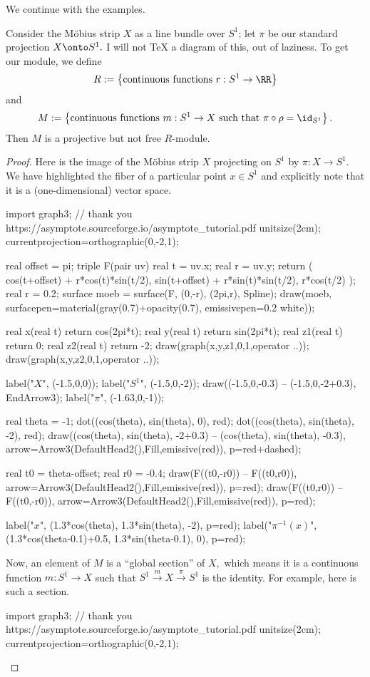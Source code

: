 We continue with the examples.
\begin{exercise}
	Consider the M\"obius strip $X$ as a line bundle over $S^1$; let $\pi$ be our standard projection $X\onto S^1.$ I will not TeX a diagram of this, out of laziness. To get our module, we define
	\[R:=\left\{\text{continuous functions }r:S^1\to\RR\right\}\]
	and
	\[M:=\left\{\text{continuous functions }m:S^1\to X\text{ such that }\pi\circ\rho=\id_{S^1}\right\}.\]
	Then $M$ is a projective but not free $R$-module.
\end{exercise}
\begin{proof}
	Here is the image of the M\"obius strip $X$ projecting on $S^1$ by $\pi:X\to S^1.$ We have highlighted the fiber of a particular point $x\in S^1$ and explicitly note that it is a (one-dimensional) vector space.
	\begin{center}
		\begin{asy}
			import graph3;
			// thank you https://asymptote.sourceforge.io/asymptote_tutorial.pdf
			unitsize(2cm);
			currentprojection=orthographic(0,-2,1);
			
			real offset = pi;
			triple F(pair uv) {
				real t = uv.x;
				real r = uv.y;
				return (
					cos(t+offset) + r*cos(t)*sin(t/2),
					sin(t+offset) + r*sin(t)*sin(t/2),
					r*cos(t/2)
				);
			}
			real r = 0.2;
			surface moeb = surface(F, (0,-r), (2pi,r), Spline);
			draw(moeb, surfacepen=material(gray(0.7)+opacity(0.7), emissivepen=0.2 white));
			
			real x(real t) {return cos(2pi*t);}
			real y(real t) {return sin(2pi*t);}
			real z1(real t) {return 0;}
			real z2(real t) {return -2;}
			draw(graph(x,y,z1,0,1,operator ..));
			draw(graph(x,y,z2,0,1,operator ..));
		
			label("$X$", (-1.5,0,0));
			label("$S^1$", (-1.5,0,-2));
			draw((-1.5,0,-0.3) -- (-1.5,0,-2+0.3), EndArrow3);
			label("$\pi$", (-1.63,0,-1));
			
			real theta = -1;
			dot((cos(theta), sin(theta), 0), red);
			dot((cos(theta), sin(theta), -2), red);
			draw((cos(theta), sin(theta), -2+0.3) -- (cos(theta), sin(theta), -0.3), arrow=Arrow3(DefaultHead2(),Fill,emissive(red)), p=red+dashed);
			
			real t0 = theta-offset;
			real r0 = -0.4;
			draw(F((t0,-r0)) -- F((t0,r0)), arrow=Arrow3(DefaultHead2(),Fill,emissive(red)), p=red);
			draw(F((t0,r0)) -- F((t0,-r0)), arrow=Arrow3(DefaultHead2(),Fill,emissive(red)), p=red);
			
			label("$x$", (1.3*cos(theta), 1.3*sin(theta), -2), p=red);
			label("$\pi^{-1}(x)$", (1.3*cos(theta-0.1)+0.5, 1.3*sin(theta-0.1), 0), p=red);
		\end{asy}
	\end{center}
	Now, an element of $M$ is a ``global section'' of $X,$ which means it is a continuous function $m:S^1\to X$ such that $S^1\stackrel m\to X\stackrel\pi\to S^1$ is the identity. For example, here is such a section.
	\begin{center}
		\begin{asy}
			import graph3;
			// thank you https://asymptote.sourceforge.io/asymptote_tutorial.pdf
			unitsize(2cm);
			currentprojection=orthographic(0,-2,1);
			

\end{asy}
\end{center}
\end{proof}
